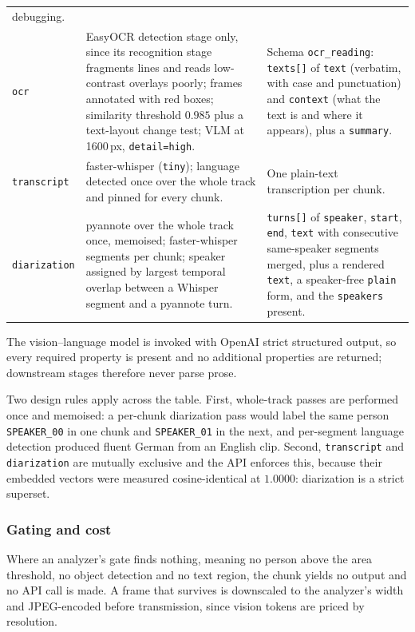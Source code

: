 \begin{table}[htbp]
\begin{tabularx}{\textwidth}{@{}L{2.2cm}L{3.5cm}X@{}}
debugging. \\
\texttt{ocr} &
EasyOCR detection stage only, since its recognition stage
fragments lines and reads low-contrast overlays poorly; frames annotated with red
boxes; similarity threshold $0.985$ plus a text-layout change test; VLM at 1600\,px,
\texttt{detail=high}. &
Schema \texttt{ocr\_reading}: \texttt{texts[]} of \texttt{text} (verbatim, with case and
punctuation) and \texttt{context} (what the text is and where it appears), plus a
\texttt{summary}. \\
\texttt{transcript} &
faster-whisper (\texttt{tiny}); language detected once over the whole track and pinned
for every chunk. &
One plain-text transcription per chunk. \\
\texttt{diarization} &
pyannote over the whole track once, memoised; faster-whisper segments per chunk;
speaker assigned by largest temporal overlap between a Whisper segment and a pyannote
turn. &
\texttt{turns[]} of \texttt{speaker}, \texttt{start}, \texttt{end}, \texttt{text} with
consecutive same-speaker segments merged, plus a rendered \texttt{text}, a
speaker-free \texttt{plain} form, and the \texttt{speakers} present. \\
\bottomrule
\end{tabularx}
\end{table}

The vision--language model is invoked with OpenAI strict structured output, so every
required property is present and no additional properties are returned; downstream
stages therefore never parse prose.

Two design rules apply across the table. First, whole-track passes are performed once
and memoised: a per-chunk diarization pass would label the same person
\texttt{SPEAKER\_00} in one chunk and \texttt{SPEAKER\_01} in the next, and per-segment
language detection produced fluent German from an English clip. Second,
\texttt{transcript} and \texttt{diarization} are mutually exclusive and the API enforces
this, because their embedded vectors were measured cosine-identical at $1.0000$:
diarization is a strict superset.

\subsubsection*{Gating and cost}

Where an analyzer's gate finds nothing, meaning no person above the area threshold, no
object detection and no text region, the chunk yields no output and no API call is made.
A frame that survives is downscaled to the analyzer's width and JPEG-encoded before
transmission, since vision tokens are priced by resolution.

